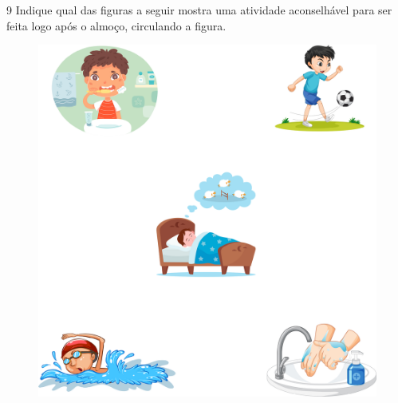 
\num{9} Indique qual das figuras a seguir mostra uma atividade aconselhável para
ser feita logo após o almoço, circulando a figura.


\begin{figure}[htpb!]
\centering
\includegraphics[width=.8\textwidth]{./media/image57.png}
\end{figure}

